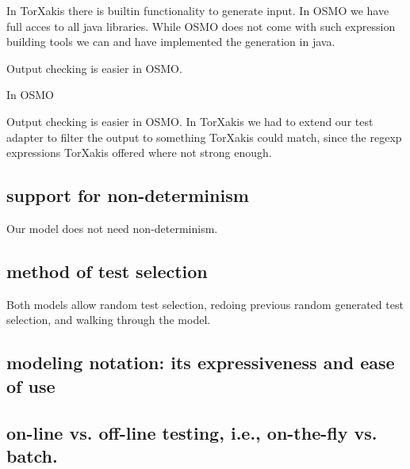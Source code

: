\documentclass[11pt,a4paper]{article}
\begin{document}
In TorXakis there is builtin functionality to generate input. In OSMO
we have full acces to all java libraries. While OSMO does not come
with such expression building tools we can and have implemented the
generation in java.

Output checking is easier in OSMO.

In OSMO

Output checking is easier in OSMO. In TorXakis we had to extend our
test adapter to filter the output to something TorXakis could match,
since the regexp expressions TorXakis offered where not strong enough.

\subsection{support for non-determinism}
Our model does not need non-determinism.

\subsection{method of test selection}
Both models allow random test selection, redoing previous random
generated test selection, and walking through the model.
\subsection{modeling notation: its expressiveness and ease of use}

\subsection{on-line vs. off-line testing, i.e., on-the-fly vs. batch.}

\end{document}
